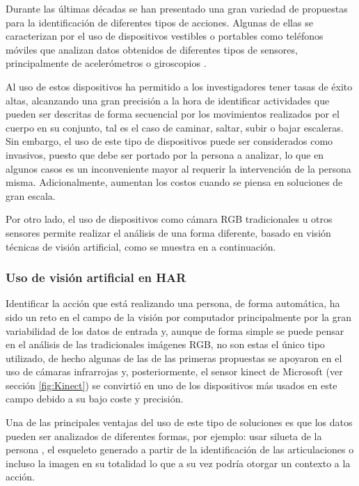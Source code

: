         Durante las últimas décadas se han presentado una gran variedad de propuestas \cite{Jobanputra2019SurveyHar} para la identificación de diferentes tipos de acciones. Algunas de ellas se caracterizan por el uso de dispositivos vestibles\cite{Gonzalez2015} o portables como teléfonos móviles que analizan datos obtenidos de diferentes tipos de sensores, principalmente de acelerómetros o giroscopios \cite{Chen2015, Chen2016, Murad2017, Guan2017, Hur2018AcelerometerCNN}.
            
        Al uso de estos dispositivos ha permitido a los investigadores tener tasas de éxito altas, alcanzando una gran precisión a la hora de identificar actividades que pueden ser descritas de forma secuencial por los movimientos realizados por el cuerpo en su conjunto, tal es el caso de caminar, saltar, subir o bajar escaleras. Sin embargo, el uso de este tipo de dispositivos puede ser considerados como invasivos, puesto que debe ser portado por la persona a analizar, lo que en algunos casos es un inconveniente mayor al requerir la intervención de la persona misma. Adicionalmente, aumentan los costos cuando se piensa en soluciones de gran escala.
        
        Por otro lado, el uso de dispositivos como cámara RGB tradicionales u otros sensores permite realizar el análisis de una forma diferente, basado en visión técnicas de visión artificial, como se muestra en a continuación. 
        
        \subsubsection{Uso de visión artificial en HAR}
        
            Identificar la acción que está realizando una persona, de forma automática, ha sido un reto en el campo de la visión por computador principalmente por la gran variabilidad de los datos de entrada y, aunque de forma simple se puede pensar en el análisis de las tradicionales imágenes RGB, no son estas el único tipo utilizado, de hecho algunas de las de las primeras propuestas se apoyaron en el uso de cámaras infrarrojas \cite{Sokolova2013} y, posteriormente, el sensor kinect de Microsoft (ver sección \ref{fig:Kinect}) se convirtió en uno de los dispositivos más usados en este campo debido a su bajo coste y precisión.
                
            Una de las principales ventajas del uso de este tipo de soluciones es que los datos pueden ser analizados de diferentes formas, por ejemplo: usar silueta de la persona \cite{Vishwakarma2015, Zeng2014, Balista2010}, el esqueleto \cite{Meshry2016} generado a partir de la identificación de las articulaciones o incluso la imagen en su totalidad \cite{Rojas2019heart} lo que a su vez podría otorgar un contexto a la acción.
            

